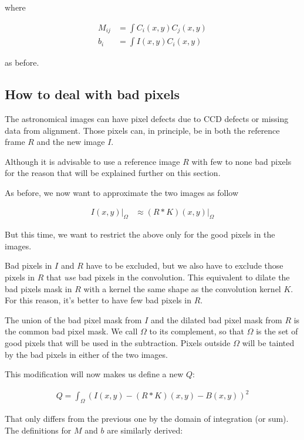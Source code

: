 where

\begin{align}
M_{ij}  &=   \int  C_{i}(x,y)  C_{j}(x,y) \\
b_{i} &=  \int I(x,y) C_{i}(x,y) 
\end{align}

as before.

\subsection*{How to deal with bad pixels} \label{badpixels}

The astronomical images can have pixel defects due to CCD defects or missing data from alignment. 
Those pixels can, in principle, be in both the reference frame $R$ and the new image $I$. 

Although it is advisable to use a reference image $R$ with few to none bad pixels for the reason that will be explained further on this section.

As before, we now want to approximate the two images as follow

\begin{align}
I(x,y)\bigg|_{\Omega} & \approx (R \mathbin{*} K)(x,y)\bigg|_{\Omega}
\end{align}

But this time, we want to restrict the above only for the good pixels in the images.

Bad pixels in $I$ and $R$ have to be excluded, but we also have to exclude those pixels in $R$ that {\em use} bad pixels in the convolution. This equivalent to dilate the bad pixels mask in $R$ with a kernel the same shape as the convolution kernel $K$. For this reason, it's better to have few bad pixels in $R$.

The union of the bad pixel mask from $I$ and the dilated bad pixel mask from $R$ is the common bad pixel mask. We call $\Omega$ to its complement, so that $\Omega$ is the set of good pixels that will be used in the subtraction. Pixels outside $\Omega$ will be tainted by the bad pixels in either of the two images.

This modification will now makes us define a new $Q$:

\begin{align}
Q = \int_{\Omega} \left( I(x,y) - (R \mathbin{*} K)(x,y) - B(x,y) \right)^2
\end{align}

That only differs from the previous one by the domain of integration (or sum).
The definitions for $M$ and $b$ are similarly derived:

